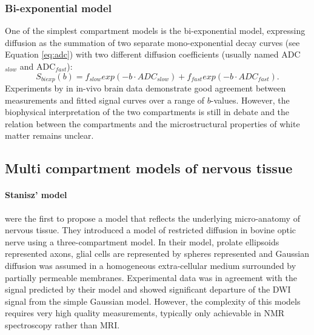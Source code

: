 \subsubsection*{Bi-exponential model}
One of the simplest compartment models is the bi-exponential model, expressing diffusion as the summation of two separate mono-exponential decay curves (see Equation \ref{eq:adc}) with two different diffusion coefficients (usually named \gls{ADC}$_{slow}$ and \gls{ADC}$_{fast}$):
\begin{equation}
	S_{biexp}(b) = f_{slow} exp(-b\cdot ADC_{slow}) + f_{fast} exp(-b\cdot ADC_{fast}).
\end{equation}
Experiments by \citet{Clark:2002} in in-vivo brain data demonstrate good agreement between measurements and fitted signal curves over a range of $b$-values. However, the biophysical interpretation of the two compartments is still in debate and the relation between the compartments and the microstructural properties of white matter remains unclear. 
\subsection*{Multi compartment models of nervous tissue}
\paragraph*{Stanisz' model}
\cite{Stanisz:1997} were the first to propose a model that reflects the underlying micro-anatomy of nervous tissue. They introduced a model of restricted diffusion in bovine optic nerve using a three-compartment model. In their model, prolate ellipsoids represented axons, glial cells are represented by spheres represented and Gaussian diffusion was assumed in a homogeneous extra-cellular medium surrounded by partially permeable membranes. Experimental data was in agreement with the signal predicted by their model and showed significant departure of the {\gls{DWI}} signal from the simple Gaussian model. However, the complexity of this models requires very high quality measurements, typically only achievable in NMR spectroscopy rather than MRI.
